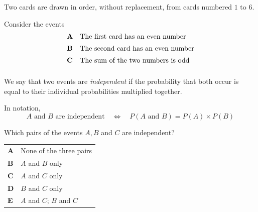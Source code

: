 \documentclass[11pt,a4paper]{article}
\begin{document}
\clearpage
\thispagestyle{djspaper}
\vspace*{8pt}
\begin{enumerate}[label=\textbf{\arabic*.},leftmargin=*,itemsep=0pt,start=14]
Two cards are drawn in order, without replacement, from cards numbered $1$ to $6$. 

Consider the events
\[
\begin{array}{@{}ll@{}}
\textbf{A} & \text{The first card has an even number} \\[5pt]
\textbf{B} & \text{The second card has an even number} \\[5pt]
\textbf{C} & \text{The sum of the two numbers is odd} \\[5pt]
\end{array}
\]

We say that two events are \emph{independent} if the probability that both occur is equal to their individual probabilities multiplied together.

In notation, \[A \text{ and } B \text{ are independent} \quad\iff\quad P(A \text{ and } B) = P(A)\times P(B)\]

Which pairs of the events $A, B$ and $C$ are independent?

\par\vspace*{12pt}
\begin{tabularx}{\linewidth}{@{}>{\bfseries}l Y@{}}
A &
None of the three pairs
\\[0.8em]
B &
$A$ and $B$ only
\\[0.8em]
C &
$A$ and $C$ only
\\[0.8em]
D &
$B$ and $C$ only
\\[0.8em]
E &
$A$ and $C$; $B$ and $C$
\\
\end{tabularx}
\end{enumerate}
\clearpage
\thispagestyle{djspaper}
\vspace*{8pt}
\end{document}
